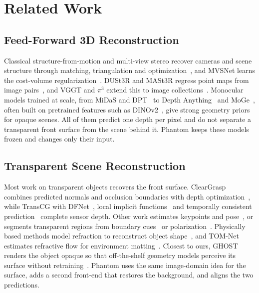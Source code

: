 \section{Related Work}
\label{sec:related}

\subsection{Feed-Forward 3D Reconstruction}
Classical structure-from-motion and multi-view stereo recover cameras and scene structure through matching, triangulation and optimization~\cite{colmap,mvs}, and MVSNet learns the cost-volume regularization~\cite{mvsnet}.
DUSt3R and MASt3R regress point maps from image pairs~\cite{dust3r,mast3r}, and VGGT and $\pi^3$ extend this to image collections~\cite{vggt,pi3}.
Monocular models trained at scale, from MiDaS and DPT~\cite{midas,dpt} to Depth Anything~\cite{depthanything,dav2,da3} and MoGe~\cite{moge,moge2,moge3}, often built on pretrained features such as DINOv2~\cite{dinov2}, give strong geometry priors for opaque scenes.
All of them predict one depth per pixel and do not separate a transparent front surface from the scene behind it.
Phantom keeps these models frozen and changes only their input.

\subsection{Transparent Scene Reconstruction}
Most work on transparent objects recovers the front surface.
ClearGrasp combines predicted normals and occlusion boundaries with depth optimization~\cite{cleargrasp}, while TransCG with DFNet~\cite{transcg}, local implicit functions~\cite{lidf} and temporally consistent prediction~\cite{consistentdepth} complete sensor depth.
Other work estimates keypoints and pose~\cite{keypose,clearpose}, or segments transparent regions from boundary cues~\cite{trans10k} or polarization~\cite{polarseg}.
Physically based methods model refraction to reconstruct object shape~\cite{lookingglass,neto}, and TOM-Net estimates refractive flow for environment matting~\cite{tomnet}.
Closest to ours, GHOST renders the object opaque so that off-the-shelf geometry models perceive its surface without retraining~\cite{ghost}.
Phantom uses the same image-domain idea for the surface, adds a second front-end that restores the background, and aligns the two predictions.

